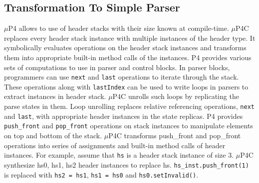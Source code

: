 
\subsection{Transformation To Simple Parser}
\label{subsection:header-stacks-variable-length-headers}
$\mu$P4 allows to use of header stacks with their size known at compile-time. 
$\mu$P4C replaces every header stack instance with multiple instances of the header type. 
It symbolically evaluates operations on the header stack instances and transforms them into appropriate built-in method calls of the instances.
P4 provides various sets of computations to use in parser and control blocks.
In parser blocks, programmers can use \texttt{next} and \texttt{last} operations to iterate through the stack.
These operations along with \texttt{lastIndex} can be used to write loops in parsers to extract instances in header stack.
$\mu$P4C unrolls such loops by replicating the parse states in them.
Loop unrolling replaces relative referencing operations, \texttt{next} and \texttt{last}, with appropriate header instances in the state replicas.
P4 provides \texttt{push\_front} and \texttt{pop\_front} operations on stack instances to manipulate elements on top and bottom of the stack.
$\mu$P4C transforms push\_front and pop\_front operations into series of assignments and built-in method calls of header instances.
For example, assume that \texttt{hs} is a header stack instance of size 3. 
$\mu$P4C synthesize hs0, hs1, hs2 header instances to replace hs.
\texttt{hs\_inst.push\_front(1)} is replaced with \texttt{hs2 = hs1}, \texttt{hs1 = hs0} and \texttt{hs0.setInvalid()}.


